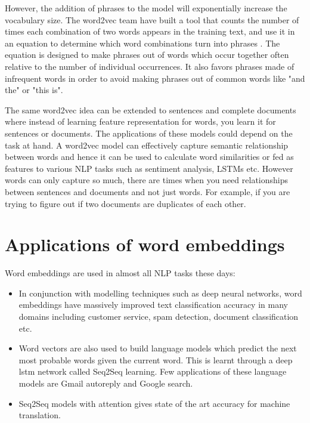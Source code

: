 However, the addition of phrases to the model will exponentially increase the vocabulary size. The word2vec team have built a tool that counts the number of times each combination of two words appears in the training text, and use it in an equation to determine which word combinations turn into phrases \cite{mikolov2013distributed}. The equation is designed to make phrases out of words which occur together often relative to the number of individual occurrences. It also favors phrases made of infrequent words in order to avoid making phrases out of common words like "and the" or "this is".

The same word2vec idea can be extended to sentences and complete documents where instead of learning feature representation for words, you learn it for sentences or documents. The applications of these models could depend on the task at hand. A word2vec model can effectively capture semantic relationship between words and hence it can be used to calculate word similarities or fed as features to various NLP tasks such as sentiment analysis, LSTMs etc. However words can only capture so much, there are times when you need relationships between sentences and documents and not just words. For example, if you are trying to figure out if two documents are duplicates of each other.

\section{Applications of word embeddings}

Word embeddings are used in almost all NLP tasks these days:

\begin{itemize}
\item In conjunction with modelling techniques such as deep neural networks, word embeddings have massively improved text classification accuracy in many domains including customer service, spam detection, document classification etc.

\item Word vectors are also used to build language models which predict the next most probable words given the current word. This is learnt through a deep lstm network called Seq2Seq learning. Few applications of these language models are Gmail autoreply and Google search.

\item Seq2Seq models with attention gives state of the art accuracy for machine translation.
\end{itemize}

